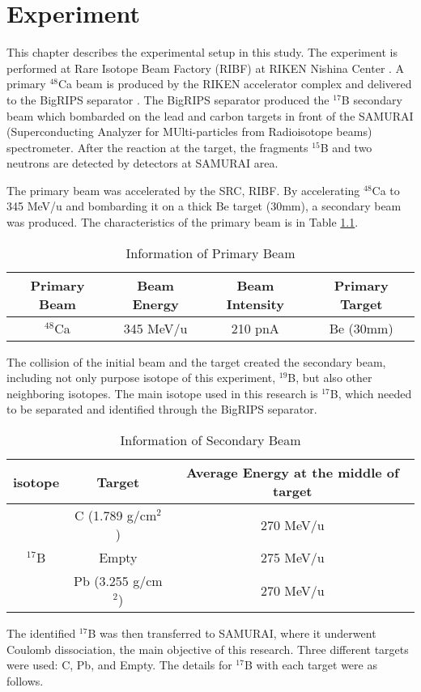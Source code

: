 \chapter{Experiment}
This chapter describes the experimental setup in this study. The experiment is performed at Rare Isotope Beam Factory (RIBF) at RIKEN Nishina Center \cite{RIKEN}. A primary ${}^{48}$Ca beam is produced by the RIKEN accelerator complex and delivered to the BigRIPS separator \cite{Kubo03}\cite{Kubo07}\cite{Kubo12}. The BigRIPS separator produced the ${}^{17}$B secondary beam which bombarded on the lead and carbon targets in front of the SAMURAI (Superconducting Analyzer for MUlti-particles from Radioisotope beams) spectrometer\cite{SAMURAI}. After the reaction at the target, the fragments ${}^{15}$B and two neutrons are detected by detectors at SAMURAI area. 



The primary beam was accelerated by the SRC, RIBF. By accelerating ${}^{48}$Ca to 345 MeV/u and bombarding it on a thick Be target (30mm), a secondary beam was produced. The characteristics of the primary beam is in Table \ref{tab:Primary_Beam}.

    \begin{table}[h]
        \centering 
            \begin{tabular}[]{c|c|c|c}
                \hline
                Primary Beam & Beam Energy & Beam Intensity & Primary Target  \\
                \hline 
                ${}^{48}$Ca & 345 MeV/u & 210 pnA & Be (30mm)\\
                \hline    
            \end{tabular}
        \caption{Information of Primary Beam}
        \label{tab:Primary_Beam}
    \end{table}
    The collision of the initial beam and the target created the secondary beam, including not only purpose isotope of this experiment, ${}^{19}$B, but also other neighboring isotopes. The main isotope used in this research is ${}^{17}$B, which needed to be separated and identified through the BigRIPS separator. 
    \begin{table}[ht]
        \centering
        \begin{tabular}[ht]{c|c|c}
            \hline
            isotope & Target & Average Energy at the middle of target \\
            \hline
            & C (1.789 g/cm$^2$)  & 270 MeV/u\\
            ${}^{17}$B & Empty  & 275 MeV/u\\
            & Pb (3.255 g/cm$^2$) & 270 MeV/u\\
            \hline    
        \end{tabular}
        \caption{Information of Secondary Beam}
    \end{table}
    The identified ${}^{17}$B was then transferred to SAMURAI, where it underwent Coulomb dissociation, the main objective of this research. Three different targets were used: C, Pb, and Empty. The details for ${}^{17}$B with each target were as follows.

